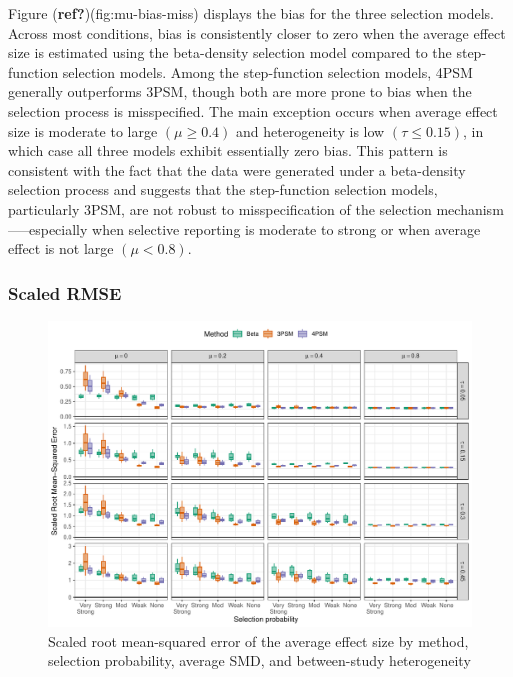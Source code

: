 \documentclass[
  american,
  man, donotrepeattitle,floatsintext]{apa7}
\begin{document}
Figure (\textbf{ref?})(fig:mu-bias-miss) displays the bias for the three selection models. Across most conditions, bias is consistently closer to zero when the average effect size is estimated using the beta-density selection model compared to the step-function selection models. Among the step-function selection models, 4PSM generally outperforms 3PSM, though both are more prone to bias when the selection process is misspecified. The main exception occurs when average effect size is moderate to large \((\mu \geq 0.4)\) and heterogeneity is low \((\tau \leq 0.15)\), in which case all three models exhibit essentially zero bias. This pattern is consistent with the fact that the data were generated under a beta-density selection process and suggests that the step-function selection models, particularly 3PSM, are not robust to misspecification of the selection mechanism-----especially when selective reporting is moderate to strong or when average effect is not large \((\mu < 0.8)\).

\subsubsection{Scaled RMSE}\label{scaled-rmse-1}

\begin{figure}
\includegraphics{beta-function-selection-models-with-dependent-effects_files/figure-latex/mu-rmse-main-miss-1} \caption{Scaled root mean-squared error of the average effect size by method, selection probability, average SMD, and between-study heterogeneity}\label{fig:mu-rmse-main-miss}
\end{figure}
\end{document}
